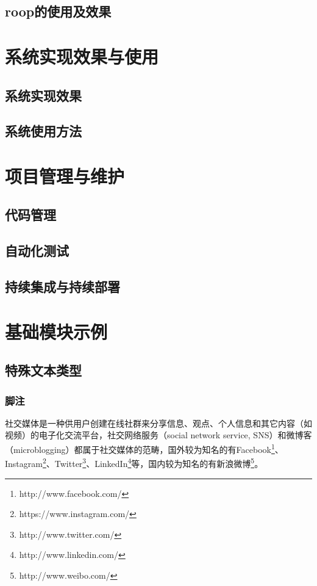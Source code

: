 \documentclass[a4paper,AutoFakeBold,oneside,12pt]{book}
\begin{document}
\section{roop的使用及效果}

\chapter{系统实现效果与使用}
\section{系统实现效果}
\section{系统使用方法}

\chapter{项目管理与维护}
\section{代码管理}
\section{自动化测试}
\section{持续集成与持续部署}






\chapter{基础模块示例}

\section{特殊文本类型}
\subsection{脚注}
社交媒体是一种供用户创建在线社群来分享信息、观点、个人信息和其它内容（如视频）的电子化交流平台，社交网络服务（social network service, SNS）和微博客（microblogging）都属于社交媒体的范畴\cite{webster_social_media}，国外较为知名的有Facebook\footnote{http://www.facebook.com/}、Instagram\footnote{https://www.instagram.com/}、Twitter\footnote{http://www.twitter.com/}、LinkedIn\footnote{http://www.linkedin.com/}等，国内较为知名的有新浪微博\footnote{http://www.weibo.com/}。
\end{document}
